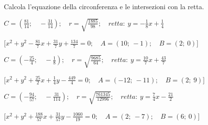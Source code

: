 \begin{esercizio}\label{ese:}
 Calcola l'equazione della circonferenza e le intersezioni con la retta.
 \begin{enumeratea}
  \item  \(C=\left (\frac{81}{14}; \quad -\frac{31}{14} \right ); \quad 
r = \sqrt{\frac{1885}{98}}; \quad retta:~y = -\frac{1}{8} x +\frac{1}{4}\)

\hfill [\(x^2 + y^2 -\frac{81}{7}x +\frac{31}{7}y +\frac{134}{7} = 0; \quad 
A = \left (10;~-1 \right ); \quad B = \left (2;~0 \right )\)]

\item  \(C=\left (-\frac{25}{4}; \quad -\frac{1}{8} \right ); \quad 
r = \sqrt{\frac{9685}{64}}; \quad retta:~y = \frac{10}{7} x +\frac{43}{7}\)

\hfill [\(x^2 + y^2 +\frac{25}{2}x +\frac{1}{4}y -\frac{449}{4} = 0; \quad 
A = \left (-12;~-11 \right ); \quad B = \left (2;~9 \right )\)]

\item  \(C=\left (-\frac{94}{57}; \quad -\frac{31}{114} \right ); \quad 
r = \sqrt{\frac{761345}{12996}}; \quad retta:~y = \frac{7}{4} x -\frac{21}{2}\)

\hfill [\(x^2 + y^2 +\frac{188}{57}x +\frac{31}{57}y -\frac{1060}{19} = 0; 
\quad A = \left (2;~-7 \right ); \quad B = \left (6;~0 \right )\)]
% 
% 
% 
% 
% 
% 
% 
% 
 \end{enumeratea}
\end{esercizio}


